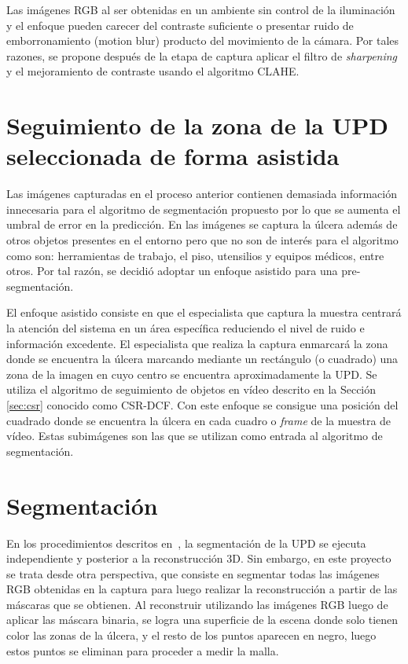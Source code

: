 {Las imágenes RGB al ser obtenidas en un ambiente sin control de la iluminación y el enfoque pueden carecer del contraste suficiente o presentar ruido de emborronamiento (motion blur) producto del movimiento de la cámara. Por tales razones, se propone después de la etapa de captura aplicar el filtro de \textit{sharpening} y el mejoramiento de contraste usando el algoritmo CLAHE.



\section{Seguimiento de la zona de la UPD seleccionada de forma asistida}\label{segasis}

Las imágenes capturadas en el proceso anterior contienen demasiada información innecesaria para el algoritmo de segmentación propuesto por lo que se aumenta el umbral de error en la predicción. En las imágenes se captura la úlcera además de otros objetos presentes en el entorno pero que no son de interés para el algoritmo como son: herramientas de trabajo, el piso, utensilios y equipos médicos, entre otros. Por tal razón, se decidió adoptar un enfoque asistido para una pre-segmentación. 

El enfoque asistido consiste en que el especialista que captura la muestra centrará la atención del sistema en un área específica reduciendo el nivel de ruido e información excedente. El especialista que realiza la captura enmarcará la zona donde se encuentra la úlcera marcando mediante un rectángulo (o cuadrado) una zona de la imagen en cuyo centro se encuentra aproximadamente la UPD. Se utiliza el algoritmo de seguimiento de objetos en vídeo descrito en la Sección \ref{sec:csr} conocido como CSR-DCF. Con este enfoque se consigue una posición del cuadrado donde se encuentra la úlcera en cada cuadro o \textit{frame} de la muestra de vídeo. Estas subimágenes son las que se utilizan como entrada al algoritmo de segmentación.

\section{Segmentación}

En los procedimientos descritos en~\cite{wang2014smartphone, filko2018wound}, la segmentación de la UPD se ejecuta independiente y posterior a la reconstrucción 3D. Sin embargo, en este proyecto se trata desde otra perspectiva, que consiste en segmentar todas las imágenes RGB obtenidas en la captura para luego realizar la reconstrucción a partir de las máscaras que se obtienen. Al reconstruir utilizando las imágenes RGB luego de aplicar las máscara binaria, se logra una superficie de la escena donde solo tienen color las zonas de la úlcera, y el resto de los puntos aparecen en negro, luego estos puntos se eliminan para proceder a medir la malla.

}
